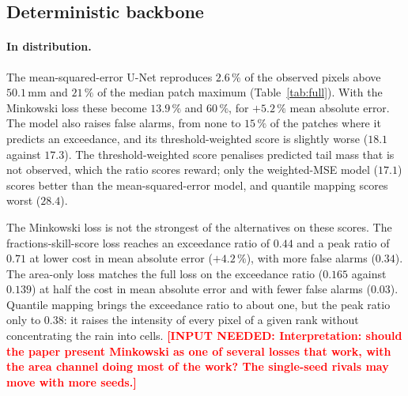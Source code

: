 \documentclass{article}
\newcommand{\needinput}[1]{\textcolor{red}{\textbf{[INPUT NEEDED: #1]}}}
\begin{document}
\subsection{Deterministic backbone}
\paragraph{In distribution.} The mean-squared-error U-Net reproduces $2.6\,\%$ of the observed pixels above
$50.1\,\mathrm{mm}$ and $21\,\%$ of the median patch maximum (Table~\ref{tab:full}). With the Minkowski loss these
become $13.9\,\%$ and $60\,\%$, for $+5.2\,\%$ mean absolute error. The model also raises false alarms, from none to
$15\,\%$ of the patches where it predicts an exceedance, and its threshold-weighted score is slightly worse ($18.1$
against $17.3$). The threshold-weighted score penalises predicted tail mass that is not observed, which the ratio
scores reward; only the weighted-MSE model ($17.1$) scores better than the mean-squared-error model, and quantile
mapping scores worst ($28.4$).

The Minkowski loss is not the strongest of the alternatives on these scores. The fractions-skill-score loss reaches an
exceedance ratio of $0.44$ and a peak ratio of $0.71$ at lower cost in mean absolute error ($+4.2\,\%$), with more
false alarms ($0.34$). The area-only loss matches the full loss on the exceedance ratio ($0.165$ against $0.139$) at
half the cost in mean absolute error and with fewer false alarms ($0.03$). Quantile mapping brings the exceedance ratio
to about one, but the peak ratio only to $0.38$: it raises the intensity of every pixel of a given rank without
concentrating the rain into cells. \needinput{Interpretation: should the paper present Minkowski as one of several
losses that work, with the area channel doing most of the work? The single-seed rivals may move with more seeds.}
\end{document}
